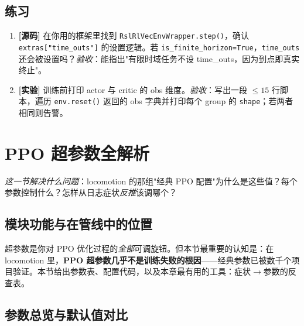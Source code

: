 \subsection{练习}

\begin{practice}
\begin{enumerate}
  \item \textbf{[源码]} 在你用的框架里找到 \verb|RslRlVecEnvWrapper.step()|，确认 \verb|extras["time_outs"]| 的设置逻辑。若 \verb|is_finite_horizon=True|，\verb|time_outs| 还会被设置吗？\emph{验收}：能指出"有限时域任务不设 time\_outs，因为到点即真实终止"。
  \item \textbf{[实验]} 训练前打印 actor 与 critic 的 obs 维度。\emph{验收}：写出一段 $\le15$ 行脚本，遍历 \verb|env.reset()| 返回的 obs 字典并打印每个 group 的 \verb|shape|；若两者相同则告警。
\end{enumerate}
\end{practice}

\section{PPO 超参数全解析}
\label{sec:rlmc-train-hyperparam}

\emph{这一节解决什么问题}：locomotion 的那组"经典 PPO 配置"为什么是这些值？每个参数控制什么？怎样从日志症状\emph{反推}该调哪个？

\subsection{模块功能与在管线中的位置}

超参数是你对 PPO 优化过程的\emph{全部}可调旋钮。但本节最重要的认知是：在 locomotion 里，\textbf{PPO 超参数几乎不是训练失败的根因}——经典参数已被数千个项目验证。本节给出参数表、配置代码，以及本章最有用的工具：症状$\to$参数的反查表。

\subsection{参数总览与默认值对比}


